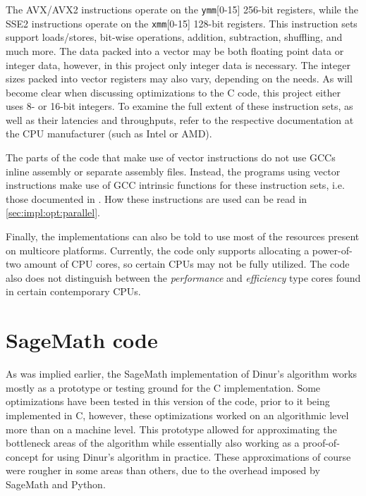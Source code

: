 The AVX/AVX2 instructions operate on the \texttt{ymm}[0-15] 256-bit registers, while the SSE2 instructions operate on the \texttt{xmm}[0-15] 128-bit registers. This instruction sets support loads/stores, bit-wise operations, addition, subtraction, shuffling, and much more. The data packed into a vector may be both floating point data or integer data, however, in this project only integer data is necessary. The integer sizes packed into vector registers may also vary, depending on the needs. As will become clear when discussing optimizations to the C code, this project either uses 8- or 16-bit integers. To examine the full extent of these instruction sets, as well as their latencies and throughputs, refer to the respective documentation at the CPU manufacturer (such as Intel or AMD).

The parts of the code that make use of vector instructions do not use GCCs inline assembly or separate assembly files. Instead, the programs using vector instructions make use of GCC intrinsic functions for these instruction sets, i.e. those documented in \cite{IntelIntr}. How these instructions are used can be read in \cref{sec:impl:opt:parallel}.

Finally, the implementations can also be told to use most of the resources present on multicore platforms. Currently, the code only supports allocating a power-of-two amount of CPU cores, so certain CPUs may not be fully utilized. The code also does not distinguish between the \textit{performance} and \textit{efficiency} type cores found in certain contemporary CPUs.

\section{SageMath code} \label{sec:impl:sage}
As was implied earlier, the SageMath implementation of Dinur's algorithm works mostly as a prototype or testing ground for the C implementation. Some optimizations have been tested in this version of the code, prior to it being implemented in C, however, these optimizations worked on an algorithmic level more than on a machine level.  This prototype allowed for approximating the bottleneck areas of the algorithm while essentially also working as a proof-of-concept for using Dinur's algorithm in practice. These approximations of course were rougher in some areas than others, due to the overhead imposed by SageMath and Python.

